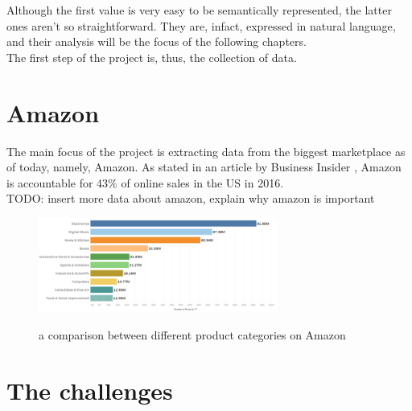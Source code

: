 \documentclass[LaM,binding=0.6cm]{sapthesis}
\begin{document}
Although the first value is very easy to be semantically represented, the latter ones aren't so straightforward. They are, infact, expressed in natural language, and their analysis will be the focus of the following chapters. \\

The first step of the project is, thus, the collection of data. 

\section{Amazon}

The main focus of the project is extracting data from the biggest marketplace as of today, namely, Amazon. As stated in an article by Business Insider \cite{intelligence_amazon_nodate}, Amazon is accountable for 43\% of online sales in the US in 2016. \\

TODO: insert more data about amazon, explain why amazon is important

\begin{figure}
\centering
\includegraphics[width=0.7\textwidth]{pictures/prod_types.png}\\[3ex]
\caption{a comparison between different product categories on Amazon}
\label{fig:prod-types}
\end{figure}

\section{The challenges}
\end{document}
